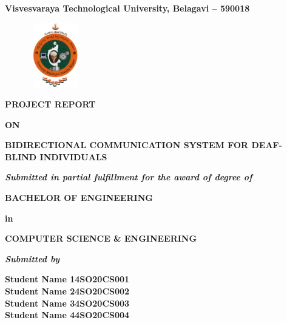 \documentclass[12pt,a4paper]{report}
\begin{document}
\pagestyle{empty}
\begin{center}

{\large \textbf{Visvesvaraya Technological University, Belagavi – 590018}}
\begin{figure}[hbtp]
\centering
\includegraphics[width=2.3cm,height=2.8cm]{./pic/vtu}
\end{figure}

\textbf{PROJECT REPORT}
\par
\textbf{ON}
\par
\vspace{6pt}
{\Large \textbf{BIDIRECTIONAL COMMUNICATION SYSTEM FOR DEAF-BLIND INDIVIDUALS}}
\par
\vspace{12pt}
\par
\textit{\textbf{Submitted in partial fulfillment for the award of degree of }}
\par
\vspace{12pt}
\large \textbf{BACHELOR OF ENGINEERING }
\par
\textbf{in}
\par
\large \textbf{COMPUTER SCIENCE \& ENGINEERING}
\par
\vspace{12pt}
\textit{\textbf{Submitted by}}
\vspace{8pt}

\textbf{\large Student Name 1}\qquad \qquad \qquad \qquad \textbf{\large 4SO20CS001}\\ \vspace{3pt} 
\textbf{\large Student Name 2}\qquad \qquad \qquad \qquad \textbf{\large 4SO20CS002}\\ \vspace{3pt}
\textbf{\large Student Name 3}\qquad \qquad \qquad \qquad \textbf{\large 4SO20CS003}\\ \vspace{3pt}
\textbf{\large Student Name 4}\qquad \qquad \qquad \qquad \textbf{\large 4SO20CS004}\\ \vspace{3pt}


\end{center}
\end{document}

